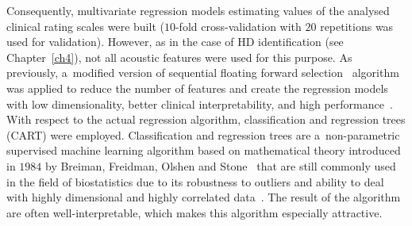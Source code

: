 Consequently, multivariate regression models estimating values of the analysed clinical rating scales were built ($10$-fold cross-validation with $20$ repetitions was used for validation). However, as in the case of HD identification (see Chapter~\ref{ch4}), not all acoustic features were used for this purpose. As previously, a~modified version of sequential floating forward selection~\cite{Pohjalainen2014} algorithm was applied to reduce the number of features and create the regression models with low dimensionality, better clinical interpretability, and high performance~\cite{Guyon2006}. With respect to the actual regression algorithm, classification and regression trees (CART) were employed. Classification and regression trees are a~non-parametric supervised machine learning algorithm based on mathematical theory introduced in $1984$ by Breiman, Freidman, Olshen and Stone~\cite{Breiman1984} that are still commonly used in the field of biostatistics due to its robustness to outliers and ability to deal with highly dimensional and highly correlated data~\cite{Hastie2009}. The result of the algorithm are often well-interpretable, which makes this algorithm especially attractive.

